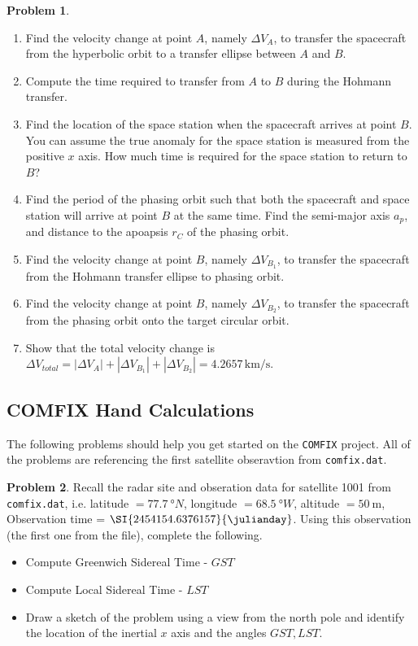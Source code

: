 \documentclass[10pt]{article}
\theoremstyle{definition}
\newtheorem{prob}{Problem}[section]
\newenvironment{subprob}%
{\renewcommand{\theenumi}{\alph{enumi}}\renewcommand{\labelenumi}{(\theenumi)}\begin{enumerate}}%
{\end{enumerate}}%
\begin{document}
\begin{prob}
\begin{subprob}
\item Find the velocity change at point $A$, namely $\Delta V_{A}$, to transfer the spacecraft from the hyperbolic orbit to a transfer ellipse between $A$ and $B$.
\item Compute the time required to transfer from $A$ to $B$ during the Hohmann transfer.
\item Find the location of the space station when the spacecraft arrives at point $B$.
    You can assume the true anomaly for the space station is measured from the positive \( x \) axis.
   How much time is required for the space station to  return to $B$?
\item Find the period of the phasing orbit such that both the spacecraft and space station will arrive at point \( B \) at the same time.
    Find the semi-major axis $a_p$, and distance to the apoapsis $r_C$ of the phasing orbit.
\item Find the velocity change at point $B$, namely $\Delta V_{B_1}$, to transfer the spacecraft from the Hohmann transfer ellipse to phasing orbit.
\item Find the velocity change at point $B$, namely $\Delta V_{B_2}$, to transfer the spacecraft from the phasing orbit onto the target circular orbit.
\item Show that the total velocity change is $\Delta V_{total} = |\Delta V_A| + |\Delta V_{B_1}| +|\Delta V_{B_2}|=4.2657\,\mathrm{km/s}$.
\end{subprob}


\end{prob}


\subsection*{COMFIX Hand Calculations}
\noindent The following problems should help you get started on the \texttt{COMFIX} project.
All of the problems are referencing the first satellite obseravtion from \texttt{comfix.dat}.

\begin{prob}
    Recall the radar site and obseration data for satellite \num{1001} from \texttt{comfix.dat}, i.e. latitude \( = \SI{77.7}{\degree} N\), longitude \( = \SI{68.5}{\degree} W\), altitude \( = \SI{50}{\meter} \), Observation time = \( \SI{ 2454154.6376157}{\julianday}\).
    Using this observation (the first one from the file), complete the following.
    \begin{itemize}
        \item Compute Greenwich Sidereal Time - \( GST \)
        \item Compute Local Sidereal Time - \( LST \)
        \item Draw a sketch of the problem using a view from the north pole and identify the location of the inertial \( x \) axis and the angles \( GST, LST\).
    \end{itemize}
\end{prob}
\end{document}

